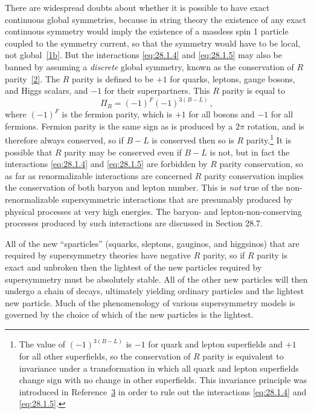 There are widespread doubts about whether it is possible to have exact
continuous global symmetries, because in string theory the existence of
any exact continuous symmetry would imply the existence of a massless
spin 1 particle coupled to the symmetry current, so that the symmetry
would have to be local, not global~\hyperref[ch28-ref-1b]{[1b]}. But the
interactions \eqref{eq:28.1.4} and \eqref{eq:28.1.5} may also be banned
by assuming a \textit{discrete} global symmetry, known as the
conservation of \(R\) parity~\hyperref[ch28-ref-2]{[2]}. The \(R\)
parity is defined to be \(+1\) for quarks, leptons, gauge bosons, and
Higgs scalars, and \(-1\) for their superpartners. This \(R\) parity is
equal to
\begin{equation}
  \Pi_R=(-1)^F(-1)^{3(B-L)}\,,
  \tag{28.1.6}\label{eq:28.1.6}
\end{equation}
where \((-1)^F\) is the fermion parity, which is \(+1\) for all bosons
and \(-1\) for all fermions. Fermion parity is the same sign as is
produced by a \(2\pi\) rotation, and is therefore always conserved, so
if \(B-L\) is conserved then so is \(R\) parity.\footnote{The value of
\((-1)^{3(B-L)}\) is \(-1\) for quark and lepton superfields and \(+1\)
for all other superfields, so the conservation of \(R\) parity is
equivalent to invariance under a transformation in which all quark and
lepton superfields change sign with no change in other superfields. This
invariance principle was introduced in
Reference~\hyperref[ch28-ref-3]{3} in order to rule out the interactions
\eqref{eq:28.1.4} and \eqref{eq:28.1.5}.} It is possible that \(R\)
parity may be conserved even if \(B-L\) is not, but in fact the
interactions \eqref{eq:28.1.4} and \eqref{eq:28.1.5} are forbidden by
\(R\) parity conservation, so as far as renormalizable interactions are
concerned \(R\) parity conservation implies the conservation of both
baryon and lepton number. This is \textit{not} true of the
non-renormalizable supersymmetric interactions that are presumably
produced by physical processes at very high energies. The baryon- and
lepton-non-conserving processes produced by such interactions are
discussed in Section 28.7.

All of the new ``sparticles'' (squarks, sleptons, gauginos, and
higgsinos) that are required by supersymmetry theories have negative
\(R\) parity, so if \(R\) parity is exact and unbroken then the lightest
of the new particles required by supersymmetry must be absolutely
stable. All of the other new particles will then undergo a chain of
decays, ultimately yielding ordinary particles and the lightest new
particle. Much of the phenomenology of various supersymmetry models is
governed by the choice of which of the new particles is the lightest.

